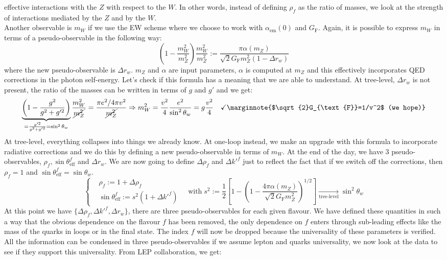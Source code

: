 \documentclass[../main.tex]{subfiles}
\begin{document}
effective interactions with the $Z$ with respect to the $W$. In other words, instead of defining $\rho_f$ as the ratio of masses, we look at the strength of interactions mediated by the $Z$ and by the $W$.\\
Another observable is $m_W$ if we use the EW scheme where we choose to work with $\alpha_{\text{em}}(0)$ and $G_{\text{F}}$. Again, it is possible to express $m_W$ in terms of a pseudo-observable in the following way:
\[
\left(1-\frac{m_W^2}{m_Z^2}\right)\frac{m_W^2}{m_Z^2}:=\frac{\pi\alpha(m_Z)}{\sqrt{2}G_{\text{F}}m_Z^2(1-\Delta r_w)}
\]
where the new pseudo-observable is $\Delta r_w$. $m_Z$ and $\alpha$ are input parameters, $\alpha$ is computed at $m_Z$ and this effectively incorporates QED corrections in the photon self-energy. Let's check if this formula has a meaning that we are able to understand. At tree-level, $\Delta r_w$ is not present, the ratio of the masses can be written in terms of $g$ and $g'$ and we get:
\[
\underbrace{\left(1-\frac{g^2}{g^2+g'^2}\right)}_{=\frac{g'^2}{g^2+g'^2}=\sin^2\theta_w}\frac{m_W^2}{\cancel{m_Z^2}}=\frac{\pi e^2/4\pi v^2}{\cancel{m_Z^2}}\Rightarrow m_W^2=\frac{v^2}{4}\frac{e^2}{\sin^2\theta_w}=g\frac{v^2}{4} \quad \checkmark\marginnote{$\sqrt{2}G_{\text{F}}=1/v^2$ (we hope)}
\]
At tree-level, everything collapses into things we already know. At one-loop instead, we make an upgrade with this formula to incorporate radiative corrections and we do this by defining a new pseudo-observable in terms of $m_W$. At the end of the day, we have 3 pseudo-observables, $\rho_f, \sin\theta_{\text{eff}}^f$ and $\Delta r_w$. We are now going to define $\Delta\rho_f$ and $\Delta k'^f$ just to reflect the fact that if we switch off the corrections, then $\rho_f=1$ and $\sin\theta_{\text{eff}}^f=\sin\theta_w$.
\[
\left\{
\begin{aligned}
&\rho_f:=1+\Delta\rho_f\\
&\sin\theta_{\text{eff}}^f:=s^2(1+\Delta k'^f)
\end{aligned}
\right.
\quad \text{with}\;s^2:=\frac{1}{2}\left[1-\left(1-\frac{4\pi\alpha(m_Z)}{\sqrt{2}G_{\text{F}}m_Z^2}\right)^{1/2}\right]\xrightarrow[\text{tree-level}]{}\sin^2\theta_w
\]
At this point we have $\{\Delta\rho_f, \Delta k'^f, \Delta r_w\}$, there are three pseudo-observables for each given flavour. We have defined these quantities in such a way that the obvious dependence on the flavour $f$ has been removed, the only dependence on $f$ enters through sub-leading effects like the mass of the quarks in loops or in the final state. The index $f$ will now be dropped because the universality of these parameters is verified. All the information can be condensed in three pseudo-observables if we assume lepton and quarks universality, we now look at the data to see if they support this universality. From LEP collaboration, we get:
\end{document}
